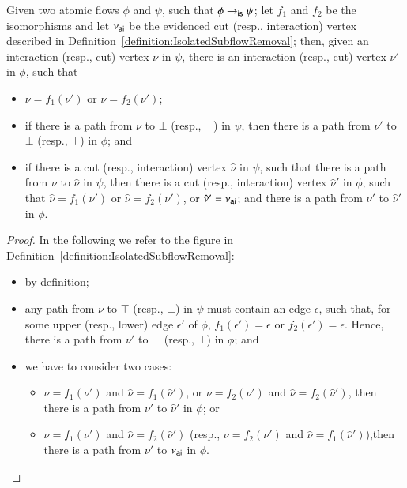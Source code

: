 \begin{lemma}\label{lemma:IsolatedSubflowRemovalPaths}
Given two atomic flows $\phi$ and $\psi$, such that $\phi\to_{\mathsf{is}}\psi$; let $f_1$ and $f_2$ be the isomorphisms and let $\nu_{\mathsf{ai}}$ be the evidenced cut (resp., interaction) vertex described in Definition~\ref{definition:IsolatedSubflowRemoval}; then, given an interaction (resp., cut) vertex $\nu$ in $\psi$, there is an interaction (resp., cut) vertex $\nu'$ in $\phi$, such that
\begin{itemize}
\item $\nu=f_1(\nu')$ or $\nu=f_2(\nu')$;
\item if there is a path from $\nu$ to $\bot$ (resp., $\top$) in $\psi$, then there is a path from $\nu'$ to $\bot$ (resp., $\top$) in $\phi$; and
\item if there is a cut (resp., interaction) vertex $\hat\nu$ in $\psi$, such that there is a path from $\nu$ to $\hat\nu$ in $\psi$, then there is a cut (resp., interaction) vertex $\hat\nu'$ in $\phi$, such that $\hat\nu=f_1(\nu')$ or $\hat\nu=f_2(\nu')$, or $\hat\nu'=\nu_{\mathsf{ai}}$; and there is a path from $\nu'$ to $\hat\nu'$ in $\phi$.
\end{itemize}
\end{lemma}

\begin{proof}
In the following we refer to the figure in Definition~\ref{definition:IsolatedSubflowRemoval}:
\begin{itemize}
 \item by definition;
 \item any path from $\nu$ to $\top$ (resp., $\bot$) in $\psi$ must contain an edge $\epsilon$, such that, for some upper (resp., lower) edge $\epsilon'$ of $\phi$, $f_1(\epsilon')=\epsilon$ or $f_2(\epsilon')=\epsilon$. Hence, there is a path from $\nu'$ to $\top$ (resp., $\bot$) in $\phi$; and
 \item we have to consider two cases:
 \begin{itemize}
  \item $\nu=f_1(\nu')$ and $\hat\nu=f_1(\hat\nu')$, or $\nu=f_2(\nu')$ and $\hat\nu=f_2(\hat\nu')$, then there is a path from $\nu'$ to $\hat\nu'$ in $\phi$; or
  \item $\nu=f_1(\nu')$ and $\hat\nu=f_2(\hat\nu')$ (resp., $\nu=f_2(\nu')$ and $\hat\nu=f_1(\hat\nu')$),then there is a path from $\nu'$ to $\nu_{\mathsf{ai}}$ in $\phi$.
 \end{itemize}
\end{itemize}
\end{proof}


